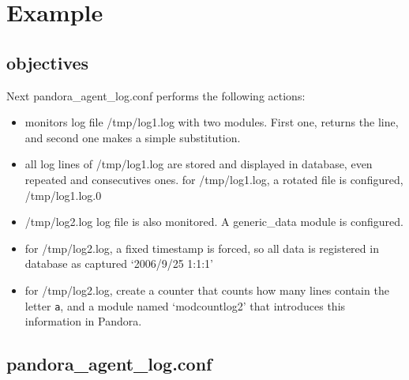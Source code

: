 \documentclass[a4paper,10pt]{article}
\begin{document}
\section{Example}\label{sec:example}

\subsection{objectives}

    Next pandora\_agent\_log.conf performs the following actions:

\begin{itemize}      
        
\item      	monitors log file /tmp/log1.log with two modules. First one, returns 
      	the line, and second one makes a simple substitution.
      	
      
\item      	all log lines of /tmp/log1.log are stored and displayed in database,
      	even repeated and consecutives ones.
      	for /tmp/log1.log, a rotated file is configured, /tmp/log1.log.0
      	
      
\item      	/tmp/log2.log log file is also monitored. A generic\_data module is 
      	configured.
      	
        
\item      	for /tmp/log2.log, a fixed timestamp is forced, so all data is 
      	registered in database as captured `2006/9/25 1:1:1'

\item 		for /tmp/log2.log, create a counter that counts how many lines contain the letter \verb|a|, and a module named `modcountlog2' that introduces this information in Pandora.
    
\end{itemize}

\subsection{pandora\_agent\_log.conf}
\end{document}
